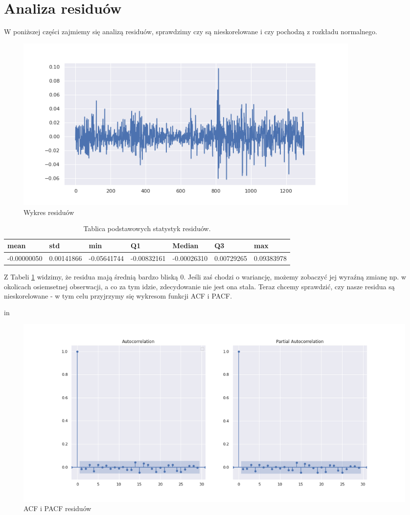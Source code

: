 \documentclass[fleqn]{article}
\theoremstyle{plain}
\begin{document}
    \section*{Analiza residuów}
        W poniższej części zajmiemy się analizą residuów, sprawdzimy czy są nieskorelowane i czy pochodzą z rozkładu normalnego. 
    \begin{figure}[H]
        \centering
        \includegraphics[width=0.85\textwidth]{residuum.png}
        \caption{Wykres residuów}
        \label{fig:residuum}
    \end{figure}
    
    \begin{table}[H]
        \centering
        \begin{tabular}{|l|l|l|l|l|l|l|}
        \hline
        mean     & std      & min       & Q1        & Median    & Q3       & max      \\ \hline
        -0.00000050 & 0.00141866 & -0.05641744 & -0.00832161 & -0.00026310 & 0.00729265 & 0.09383978 \\ \hline
        \end{tabular}
        \caption{Tablica  podstawowych statystyk residuów.}
        \label{tab:resid}
    \end{table}

    Z Tabeli \ref{tab:resid} widzimy, że residua mają średnią bardzo bliską 0.
    Jeśli zaś chodzi o wariancję, możemy zobaczyć jej wyraźną zmianę np. w okolicach osiemsetnej obserwacji, a co za tym 
    idzie, zdecydowanie nie jest ona stała. Teraz chcemy sprawdzić, czy nasze residua są nieskorelowane - w tym celu
    przyjrzymy się wykresom funkcji ACF i PACF.


     in

    \begin{figure}[H]
        \centering
        \includegraphics[width=1\textwidth]{res_acf_pacf.png}
        \caption{ACF i PACF residuów}
        \label{fig:res_acf_pacf}
    \end{figure}
\end{document}
